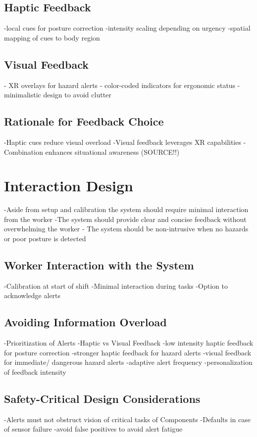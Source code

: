 \subsection{Haptic Feedback}
-local cues for posture correction
-intensity scaling depending on urgency
-spatial mapping of cues to body region
\subsection{Visual Feedback}
- XR overlays for hazard alerts
- color-coded indicators for ergonomic status
- minimalistic design to avoid clutter

\subsection{Rationale for Feedback Choice}
-Haptic cues reduce visual overload
-Visual feedback leverages XR capabilities
-Combination enhances situational awareness (SOURCE!!)

\section{Interaction Design}
-Aside from setup and calibration the system should require minimal interaction from the worker
-The system should provide clear and concise feedback without overwhelming the worker
- The system should be non-intrusive when no hazards or poor posture is detected
\subsection{Worker Interaction with the System}
-Calibration at start of shift
-Minimal interaction during tasks
-Option to acknowledge alerts

\subsection{Avoiding Information Overload}
-Prioritization of Alerts
-Haptic vs Visual Feedback
-low intensity haptic feedback for posture correction
-stronger haptic feedback for hazard alerts
-visual feedback for immediate/ dangerous hazard alerts
-adaptive alert frequency 
-personalization of feedback intensity

\subsection{Safety-Critical Design Considerations}
-Alerts must not obstruct vision of critical tasks of Components
-Defaults in case of sensor failure
-avoid false positives to avoid alert fatigue


